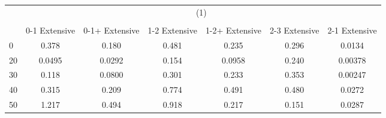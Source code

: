 \begin{tabular}{l*{6}{c}}
\hline\hline
            &\multicolumn{6}{c}{(1)}                                                      \\
            &\multicolumn{6}{c}{}                                                         \\
            &0-1 Extensive&0-1+ Extensive&1-2 Extensive&1-2+ Extensive&2-3 Extensive&2-1 Extensive\\
\hline
0           &       0.378&       0.180&       0.481&       0.235&       0.296&      0.0134\\
20          &      0.0495&      0.0292&       0.154&      0.0958&       0.240&     0.00378\\
30          &       0.118&      0.0800&       0.301&       0.233&       0.353&     0.00247\\
40          &       0.315&       0.209&       0.774&       0.491&       0.480&      0.0272\\
50          &       1.217&       0.494&       0.918&       0.217&       0.151&      0.0287\\
\hline\hline
\end{tabular}
